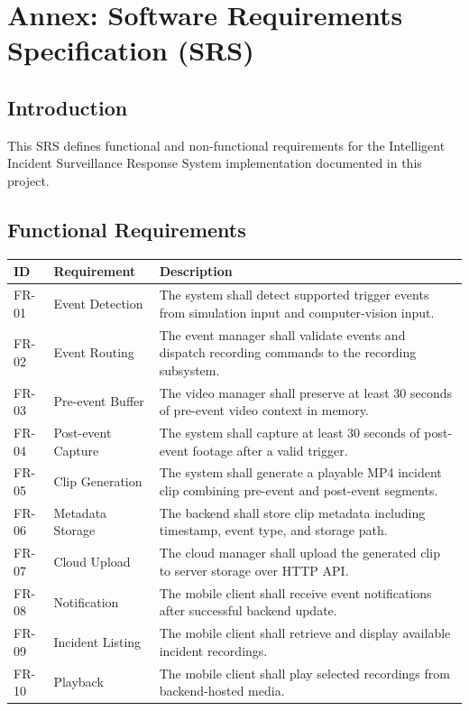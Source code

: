 \chapter{Annex: Software Requirements Specification (SRS)}
\section{Introduction}
This SRS defines functional and non-functional requirements for the Intelligent Incident Surveillance Response System implementation documented in this project.

\section{Functional Requirements}
\begin{longtable}{|p{1.6cm}|p{5.0cm}|p{7.6cm}|}
\hline
\textbf{ID} & \textbf{Requirement} & \textbf{Description} \\
\hline
FR-01 & Event Detection & The system shall detect supported trigger events from simulation input and computer-vision input. \\
\hline
FR-02 & Event Routing & The event manager shall validate events and dispatch recording commands to the recording subsystem. \\
\hline
FR-03 & Pre-event Buffer & The video manager shall preserve at least 30 seconds of pre-event video context in memory. \\
\hline
FR-04 & Post-event Capture & The system shall capture at least 30 seconds of post-event footage after a valid trigger. \\
\hline
FR-05 & Clip Generation & The system shall generate a playable MP4 incident clip combining pre-event and post-event segments. \\
\hline
FR-06 & Metadata Storage & The backend shall store clip metadata including timestamp, event type, and storage path. \\
\hline
FR-07 & Cloud Upload & The cloud manager shall upload the generated clip to server storage over HTTP API. \\
\hline
FR-08 & Notification & The mobile client shall receive event notifications after successful backend update. \\
\hline
FR-09 & Incident Listing & The mobile client shall retrieve and display available incident recordings. \\
\hline
FR-10 & Playback & The mobile client shall play selected recordings from backend-hosted media. \\
\hline
\end{longtable}

